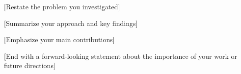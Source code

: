 
\label{sec:conclusion}

[Restate the problem you investigated]

[Summarize your approach and key findings]

[Emphasize your main contributions]

[End with a forward-looking statement about the importance of your work or future directions]

